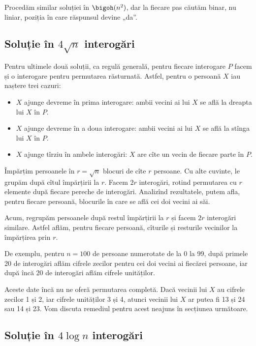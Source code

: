 Procedăm similar soluției în $\bigoh(n^2)$, dar la fiecare pas căutăm binar, nu liniar, poziția în care răspunsul devine „da”.

\subsection{Soluție în \texorpdfstring{$4 \sqrt{n}$}{4 sqrt(n)} interogări}

Pentru ultimele două soluții, ca regulă generală, pentru fiecare interogare $P$ facem și o interogare pentru permutarea răsturnată. Astfel, pentru o persoană $X$ iau naștere trei cazuri:

\begin{itemize}
  \item $X$ ajunge devreme în prima interogare: ambii vecini ai lui $X$ se află la dreapta lui $X$ în $P$.
  \item $X$ ajunge devreme în a doua interogare: ambii vecini ai lui $X$ se află la stînga lui $X$ în $P$.
  \item $X$ ajunge tîrziu în ambele interogări: $X$ are cîte un vecin de fiecare parte în $P$.
\end{itemize}

Împărțim persoanele în $r = \sqrt{n}$ blocuri de cîte $r$ persoane. Cu alte cuvinte, le grupăm după cîtul împărțirii la $r$. Facem $2r$ interogări, rotind permutarea cu $r$ elemente după fiecare pereche de interogări. Analizînd rezultatele, putem afla, pentru fiecare persoană, blocurile în care se află cei doi vecini ai săi.

Acum, regrupăm persoanele după restul împărțirii la $r$ și facem $2r$ interogări similare. Astfel aflăm, pentru fiecare persoană, cîturile și resturile vecinilor la împărțirea prin $r$.

De exemplu, pentru $n = 100$ de persoane numerotate de la 0 la 99, după primele 20 de interogări aflăm cifrele zecilor pentru cei doi vecini ai fiecărei persoane, iar după încă 20 de interogări aflăm cifrele unităților.

Aceste date încă nu ne oferă permutarea completă. Dacă vecinii lui $X$ au cifrele zecilor 1 și 2, iar cifrele unităților 3 și 4, atunci vecinii lui $X$ ar putea fi 13 și 24 sau 14 și 23. Vom discuta remediul pentru acest neajuns în secțiunea următoare.

\subsection{Soluție în \texorpdfstring{$4 \log n$}{4 log n} interogări}

